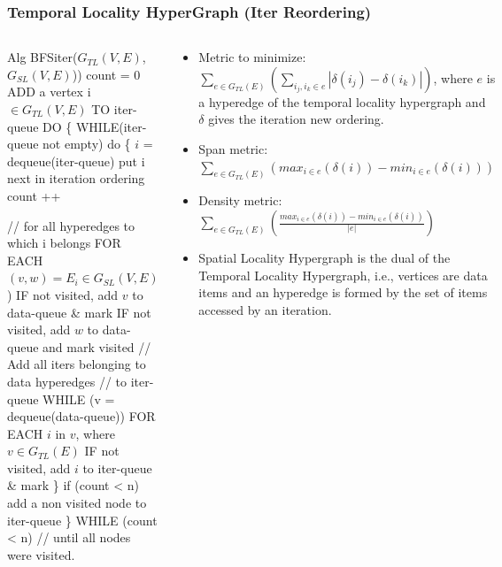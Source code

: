 \documentclass{beamer}
\newcommand{\mymath}[1]{$ #1 $}
\newcommand{\myindx}[1]{_{#1}}
\begin{document}
\begin{frame}[fragile,t]
  \frametitle{Temporal Locality HyperGraph (Iter Reordering)}

\begin{columns}
\begin{colorcode}
Alg BFSiter(\mymath{G\myindx{TL}(V,E)}, \mymath{G\myindx{SL}(V,E)}))
count = 0
ADD a vertex i\mymath{\in{}G\myindx{TL}(V,E)} TO iter-queue
DO \{
  WHILE(iter-queue not empty) do \{
    \mymath{i} = dequeue(iter-queue)
    put i next in iteration ordering
    count ++

    // for all hyperedges to which i belongs
    FOR EACH \mymath{(v,w) = E\myindx{i} \in G\myindx{SL}(V,E)}) 
      IF not visited, add \mymath{v} to data-queue \& mark
      IF not visited, add \mymath{w} to data-queue 
                                and mark visited
    // Add all iters belonging to data hyperedges 
    // to iter-queue
    WHILE (v = dequeue(data-queue))
      FOR EACH \mymath{i} in \mymath{v}, where \mymath{v \in G\myindx{TL}(E)}
        IF not visited, add \mymath{i} to iter-queue \& mark 
  \}
  if (count < n) add a non visited node to iter-queue
\} WHILE (count < n)  // until all nodes were visited.  
\end{colorcode}
\begin{scriptsize}
\begin{itemize}
    \item Metric to minimize: $\sum_{e\in G_{TL}(E)}(\sum_{i_j,i_k\in e} |\delta(i_j)-\delta(i_k)|)$,
                where $e$ is a hyperedge of the temporal locality hypergraph and 
                $\delta$ gives the iteration new ordering.\bigskip
    \item Span metric: $\sum_{e\in G_{TL}(E)}( max_{i\in e}(\delta(i)) - min_{i \in e}(\delta(i)) )$\bigskip
    \item Density metric: $\sum_{e\in G_{TL}(E)}( \frac{max_{i\in e}(\delta(i)) - min_{i \in e}(\delta(i))}{|e|} )$\bigskip
    \item Spatial Locality Hypergraph is the dual of the Temporal Locality Hypergraph,
            i.e., vertices are data items and an hyperedge is formed by the set of items
            accessed by an iteration.
\end  {itemize} 
\end{scriptsize}
\end{columns}
 
\end{frame}
\end{document}
